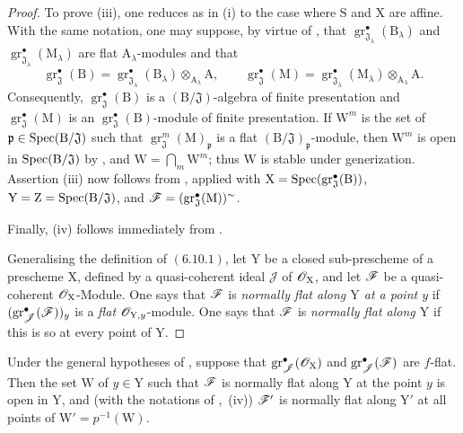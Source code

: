 \begin{proof}
To prove (iii), one reduces as in (i) to the case where $\mathrm{S}$ and $\mathrm{X}$ are affine. With the same notation, one may suppose, by virtue of , that $\operatorname{gr}^\bullet_{\mathfrak{J}_\lambda}(\mathrm{B}_\lambda)$ and $\operatorname{gr}^\bullet_{\mathfrak{J}_\lambda}(\mathrm{M}_\lambda)$ are flat $\mathrm{A}_\lambda$-modules and that
\[
\operatorname{gr}^\bullet_\mathfrak{J}(\mathrm{B})
=\operatorname{gr}^\bullet_{\mathfrak{J}_\lambda}(\mathrm{B}_\lambda)\otimes_{\mathrm{A}_\lambda}\mathrm{A},
\qquad
\operatorname{gr}^\bullet_\mathfrak{J}(\mathrm{M})
=\operatorname{gr}^\bullet_{\mathfrak{J}_\lambda}(\mathrm{M}_\lambda)\otimes_{\mathrm{A}_\lambda}\mathrm{A}.
\]
Consequently, $\operatorname{gr}^\bullet_\mathfrak{J}(\mathrm{B})$ is a $(\mathrm{B}/\mathfrak{J})$-algebra of finite presentation and $\operatorname{gr}^\bullet_\mathfrak{J}(\mathrm{M})$ is an $\operatorname{gr}^\bullet_\mathfrak{J}(\mathrm{B})$-module of finite presentation. If $\mathrm{W}^m$ is the set of $\mathfrak{p}\in\operatorname{Spec}(\mathrm{B}/\mathfrak{J})$ such that $\operatorname{gr}^m_\mathfrak{J}(\mathrm{M})_{\mathfrak{p}}$ is a flat $(\mathrm{B}/\mathfrak{J})_{\mathfrak{p}}$-module, then $\mathrm{W}^m$ is open in $\operatorname{Spec}(\mathrm{B}/\mathfrak{J})$ by , and $\mathrm{W}=\bigcap_m\mathrm{W}^m$; thus $\mathrm{W}$ is stable under generization. Assertion (iii) now follows from , applied with $\mathrm{X}=\operatorname{Spec}(\operatorname{gr}^\bullet_\mathfrak{J}(\mathrm{B}))$, $\mathrm{Y}=\mathrm{Z}=\operatorname{Spec}(\mathrm{B}/\mathfrak{J})$, and $\mathscr{F}=(\operatorname{gr}^\bullet_\mathfrak{J}(\mathrm{M}))^\sim$.

Finally, (iv) follows immediately from .

Generalising the definition of $(6.10.1)$, let $\mathrm{Y}$ be a closed sub-prescheme of a prescheme $\mathrm{X}$, defined by a quasi-coherent ideal $\mathscr{J}$ of $\mathscr{O}_\mathrm{X}$, and let $\mathscr{F}$ be a quasi-coherent $\mathscr{O}_\mathrm{X}$-Module. One says that $\mathscr{F}$ is \emph{normally flat along $\mathrm{Y}$ at a point $y$} if $(\operatorname{gr}^\bullet_\mathscr{J}(\mathscr{F}))_y$ is a \emph{flat} $\mathscr{O}_{\mathrm{Y},y}$-module. One says that $\mathscr{F}$ is \emph{normally flat along $\mathrm{Y}$} if this is so at every point of $\mathrm{Y}$.
\end{proof}

\begin{corollary}[11.3.5]
\label{IV.11.3.5}
Under the general hypotheses of , suppose that $\operatorname{gr}^\bullet_\mathscr{J}(\mathscr{O}_\mathrm{X})$ and $\operatorname{gr}^\bullet_\mathscr{J}(\mathscr{F})$ are $f$-flat. Then the set $\mathrm{W}$ of $y\in\mathrm{Y}$ such that $\mathscr{F}$ is normally flat along $\mathrm{Y}$ at the point $y$ is open in $\mathrm{Y}$, and \textup{(with the notations of ,~(iv))} $\mathscr{F}'$ is normally flat along $\mathrm{Y}'$ at all points of $\mathrm{W}'=p^{-1}(\mathrm{W})$.
\end{corollary}

